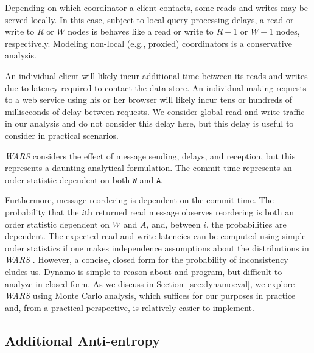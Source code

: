 \documentclass{vldb}
\begin{document}
Depending on which coordinator a client contacts, some reads and
writes may be served locally.  In this case, subject to local query
processing delays, a read or write to $R$ or $W$ nodes is behaves like
a read or write to $R-1$ or $W-1$ nodes, respectively.  Modeling
non-local (e.g., proxied) coordinators is a conservative analysis.

An individual client will likely incur additional time between its
reads and writes due to latency required to contact the data store.
An individual making requests to a web service using his or her
browser will likely incur tens or hundreds of milliseconds of delay
between requests.  We consider global read and write traffic in our
analysis and do not consider this delay here, but this delay is useful
to consider in practical scenarios.

\textit{WARS} considers the effect of message sending, delays, and
reception, but this represents a daunting analytical formulation.  The
commit time represents an order statistic dependent on both \texttt{W}
and \texttt{A}.   Furthermore, message reordering is dependent on the
commit time.  The probability that the $i$th returned read message
observes reordering is both an order statistic dependent on $W$ and
$A$, and, between $i$, the probabilities are dependent.  The expected
read and write latencies can be computed using simple order statistics
if one makes independence assumptions about the distributions in
\textit{WARS} .  However, a concise, closed form for the probability
of inconsistency eludes us.  Dynamo is simple to reason about and
program, but difficult to analyze in closed form.  As we discuss in
Section~\ref{sec:dynamoeval}, we explore \textit{WARS} using Monte
Carlo analysis, which suffices for our purposes in practice and, from
a practical perspective, is relatively easier to implement.

\subsection{Additional Anti-entropy}
\end{document}
